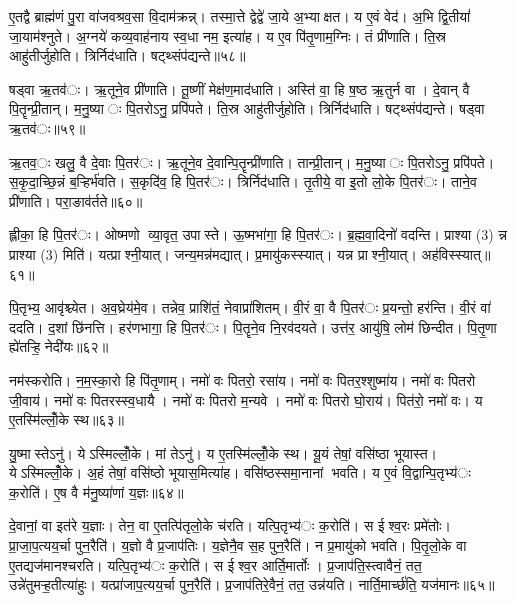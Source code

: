 ए॒तद्वै ब्राह्म॑णं पु॒रा वा॑जवश्रव॒सा वि॒दाम॑क्रन्न्। तस्मा॒त्ते द्वेद्वे॑ जा॒ये अ॒भ्याक्षत। य ए॒वं वेद॑। अ॒भि द्वि॒तीयां॑ जा॒याम॑श्नुते। अ॒ग्नये॑ कव्य॒वाह॑नाय स्व॒धा नम॒ इत्या॑ह। य ए॒व पि॑तृ॒णाम॒ग्निः। तं प्री॑णाति। ति॒स्र आहु॑तीर्जुहोति। त्रिर्निद॑धाति। षट्थ्संप॑द्यन्ते॥५८॥

षड्वा ऋ॒तव॑ः। ऋ॒तूने॒व प्री॑णाति। तू॒ष्णीं मेक्ष॑ण॒माद॑धाति। अस्ति॑ वा॒ हि ष॒ष्ठ ऋ॒तुर्न वा। दे॒वान् वै पि॒तॄन्प्री॒तान्। म॒नु॒ष्याः पि॒तरोऽनु॒ प्रपि॑पते। ति॒स्र आहु॑तीर्जुहोति। त्रिर्निद॑धाति। षट्थ्संप॑द्यन्ते। षड्वा ऋ॒तव॑ः॥५९॥

ऋ॒तव॒ः खलु॒ वै दे॒वाः पि॒तर॑ः। ऋ॒तूने॒व दे॒वान्पि॒तॄन्प्री॑णाति। तान्प्री॒तान्। म॒नु॒ष्याः पि॒तरोऽनु॒ प्रपि॑पते। स॒कृ॒दा॒च्छि॒न्नं ब॒ऱ्हिर्भ॑वति। स॒कृदि॑व॒ हि पि॒तर॑ः। त्रिर्निद॑धाति। तृ॒तीये॒ वा इ॒तो लो॒के पि॒तर॑ः। ताने॒व प्री॑णाति। परा॒ङाव॑र्तते॥६०॥

ह्लीका॒ हि पि॒तर॑ः। ओष्मणो व्या॒वृत॒ उपास्ते। ऊ॒ष्मभा॑गा॒ हि पि॒तर॑ः। ब्र॒ह्म॒वा॒दिनो॑ वदन्ति। प्राश्या (3) न्न प्राश्या (3) मिति॑। यत्प्राश्नी॒यात्। जन्य॒मन्न॑मद्यात्। प्र॒मायु॑कस्स्यात्। यन्न प्राश्नी॒यात्। अह॑विस्स्यात्॥६१॥

पि॒तृभ्य॒ आवृ॑श्च्येत। अ॒व॒घ्रेय॑मे॒व। तन्नेव॒ प्राशि॑तं॒ नेवाप्रा॑शितम्। वी॒रं वा॒ वै पि॒तर॑ः प्र॒यन्तो॒ हर॑न्ति। वी॒रं वा॑ ददति। द॒शां छि॑नत्ति। हर॑णभागा॒ हि पि॒तर॑ः। पि॒तॄने॒व नि॒रव॑दयते। उत्त॑र॒ आयु॑षि॒ लोम॑ छिन्दीत। पि॒तृ॒णा ह्ये॑तऱ्हि॒ नेदी॑यः॥६२॥

नम॑स्करोति। न॒म॒स्का॒रो हि पि॑तृ॒णाम्। नमो॑ वः पितरो॒ रसा॑य। नमो॑ वः पितर॒श्शुष्मा॑य। नमो॑ वः पितरो जी॒वाय॑। नमो॑ वः पितरस्स्व॒धायै। नमो॑ वः पितरो म॒न्यवे। नमो॑ वः पितरो घो॒राय॑। पित॑रो॒ नमो॑ वः। य ए॒तस्मि॑ल्लोँ॒के स्थ॥६३॥

यु॒ष्मास्तेऽनु॑। येऽस्मिल्लोँ॒के। मां तेऽनु॑। य ए॒तस्मि॑ल्लोँ॒के स्थ। यू॒यं तेषां॒ वसि॑ष्ठा भूयास्त। येऽस्मिल्लोँ॒के। अ॒हं तेषां॒ वसि॑ष्ठो भूयास॒मित्या॑ह। वसि॑ष्ठस्समा॒नानां भवति। य ए॒वं वि॒द्वान्पि॒तृभ्य॑ः क॒रोति॑। ए॒ष वै म॑नु॒ष्या॑णां य॒ज्ञः॥६४॥

दे॒वानां॒ वा इत॑रे य॒ज्ञाः। तेन॒ वा ए॒तत्पि॑तृलो॒के च॑रति। यत्पि॒तृभ्य॑ः क॒रोति॑। स ईश्व॒रः प्रमे॑तोः। प्रा॒जा॒प॒त्यय॒र्चा पुन॒रैति॑। य॒ज्ञो वै प्र॒जाप॑तिः। य॒ज्ञेनै॒व स॒ह पुन॒रैति॑। न प्र॒मायु॑को भवति। पि॒तृ॒लो॒के वा ए॒तद्यज॑मानश्चरति। यत्पि॒तृभ्य॑ः क॒रोति॑। स ईश्व॒र आर्ति॒मार्तोः। प्र॒जाप॑ति॒स्त्वावैनं॒ तत॒ उन्ने॑तुमऱ्ह॒तीत्या॑हुः। यत्प्रा॑जाप॒त्यय॒र्चा पुन॒रैति॑। प्र॒जाप॑तिरे॒वैनं॒ तत॒ उन्न॑यति। नार्ति॒मार्च्छ॑ति॒ यज॑मानः॥६५॥



